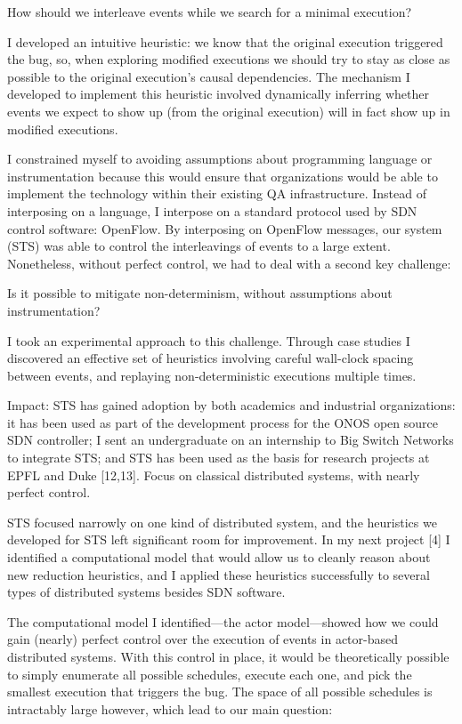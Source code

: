 	How should we interleave events while we search for a minimal execution?

I developed an intuitive heuristic: we know that the original execution triggered the bug, so, when exploring modified executions we should try to stay as close as possible to the original execution’s causal dependencies. The mechanism I developed to implement this heuristic involved dynamically inferring whether events we expect to show up (from the original execution) will in fact show up in modified executions.

I constrained myself to avoiding assumptions about programming language or instrumentation because this would ensure that organizations would be able to implement the technology within their existing QA infrastructure. Instead of interposing on a language, I interpose on a standard protocol used by SDN control software: OpenFlow. By interposing on OpenFlow messages, our system (STS) was able to control the interleavings of events to a large extent. Nonetheless, without perfect control, we had to deal with a second key challenge:

Is it possible to mitigate non-determinism, without assumptions about instrumentation?

I took an experimental approach to this challenge. Through case studies I discovered an effective set of heuristics involving careful wall-clock spacing between events, and replaying non-deterministic executions multiple times.

Impact: STS has gained adoption by both academics and industrial organizations: it has been used as part of the development process for the ONOS open source SDN controller; I sent an undergraduate on an internship to Big Switch Networks to integrate STS; and STS has been used as the basis for research projects at EPFL and Duke [12,13].
Focus on classical distributed systems, with nearly perfect control.

STS focused narrowly on one kind of distributed system, and the heuristics we
developed for STS left significant room for improvement. In my next project
[4] I identified a computational model that would allow us to cleanly reason
about new reduction heuristics, and I applied these heuristics successfully to several types of distributed systems besides SDN software.

The computational model I identified---the actor model---showed how we could gain (nearly) perfect control over the execution of events in actor-based distributed systems. With this control in place, it would be theoretically possible to simply enumerate all possible schedules, execute each one, and pick the smallest execution that triggers the bug. The space of all possible schedules is intractably large however, which lead to our main question:

